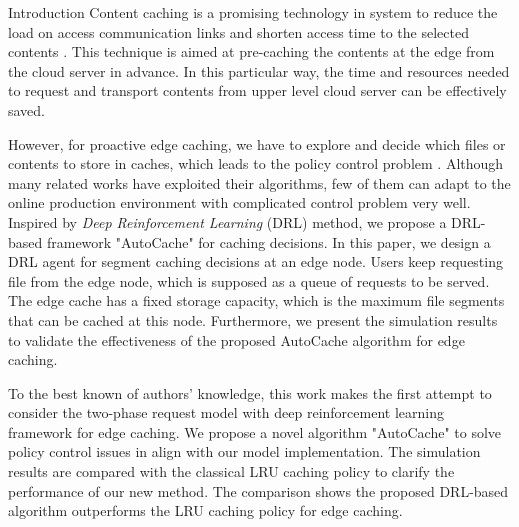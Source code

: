 \documentclass{article}
\begin{document}
\begin{section}{Introduction}
    \label{sec:intro}
    Content caching is a promising technology in system to reduce the load on access communication links and shorten access time to the selected contents \cite{general-cache}. This technique is aimed at pre-caching the contents at the edge from the cloud server in advance. In this particular way, the time and resources needed to request and transport contents from upper level cloud server can be effectively saved.
    
    
    However, for proactive edge caching, we have to explore and decide which files or contents to store in caches, which leads to the policy control problem \cite{DBLP:journals/corr/abs-1712-08132}. Although many related works have exploited their algorithms, few of them can adapt to the online production environment with complicated control problem very well. Inspired by \emph{Deep Reinforcement Learning} (DRL) method, we propose a DRL-based framework "AutoCache" for caching decisions. In this paper, we design a DRL agent for segment caching decisions at an edge node. Users keep requesting file from the edge node, which is supposed as a queue of requests to be served. The edge cache has a fixed storage capacity, which is the maximum file segments that can be cached at this node. Furthermore, we present the simulation results to validate the effectiveness of the proposed AutoCache algorithm for edge caching.
    
    To the best known of authors' knowledge, this work makes the first attempt to consider the two-phase request model with deep reinforcement learning framework for edge caching. We propose a novel algorithm "AutoCache" to solve policy control issues in align with our model implementation. The simulation results are compared with the classical LRU caching policy to clarify the performance of our new method. The comparison shows the proposed DRL-based algorithm outperforms the LRU caching policy for edge caching.
\end{section}
\end{document}
